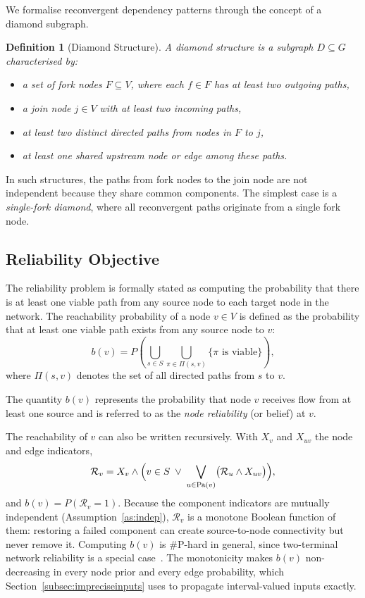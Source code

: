 \documentclass[preprint,12pt]{elsarticle}
\newtheorem{definition}{Definition}[section]
\begin{document}
We formalise reconvergent dependency patterns through the concept of a diamond subgraph.

\begin{definition}[Diamond Structure]
A diamond structure is a subgraph $D \subseteq G$ characterised by:
\begin{itemize}
    \item a set of fork nodes $F \subseteq V$, where each $f \in F$ has at least two outgoing paths,
    \item a join node $j \in V$ with at least two incoming paths,
    \item at least two distinct directed paths from nodes in $F$ to $j$,
    \item at least one shared upstream node or edge among these paths.
\end{itemize}
\end{definition}

In such structures, the paths from fork nodes to the join node are not independent because they share common components. The simplest case is a \emph{single-fork diamond}, where all reconvergent paths originate from a single fork node.

\subsection{Reliability Objective}

The reliability problem is formally stated as computing the probability that there is at least one viable path from any source node to each target node in the network. The reachability probability of a node $v \in V$ is defined as the probability that at least one viable path exists from any source node to $v$:
\begin{equation}
b(v) = P\left( \bigcup_{s \in S} \bigcup_{\pi \in \Pi(s,v)} 
\{\pi \text{ is viable}\} \right),
\end{equation}
where $\Pi(s,v)$ denotes the set of all directed paths from $s$ to $v$.

The quantity $b(v)$ represents the probability that node $v$ receives flow from at least one source and is referred to as the \emph{node reliability} (or belief) at $v$.

The reachability of $v$ can also be written recursively. With $X_v$ and $X_{uv}$ the node and edge indicators,
\begin{equation}\label{eq:reach_indicator}
\mathcal{R}_v = X_v \wedge \Bigl( v \in S \;\vee\; \bigvee_{u \in \text{Pa}(v)} \bigl( \mathcal{R}_u \wedge X_{uv} \bigr) \Bigr),
\end{equation}
and $b(v) = P(\mathcal{R}_v = 1)$. Because the component indicators are mutually independent (Assumption~\ref{as:indep}), $\mathcal{R}_v$ is a monotone Boolean function of them: restoring a failed component can create source-to-node connectivity but never remove it. Computing $b(v)$ is \#P-hard in general, since two-terminal network reliability is a special case~\cite{valiant_complexity_1979,ball_complexity_1980}. The monotonicity makes $b(v)$ non-decreasing in every node prior and every edge probability, which Section~\ref{subsec:impreciseinputs} uses to propagate interval-valued inputs exactly.
\end{document}
